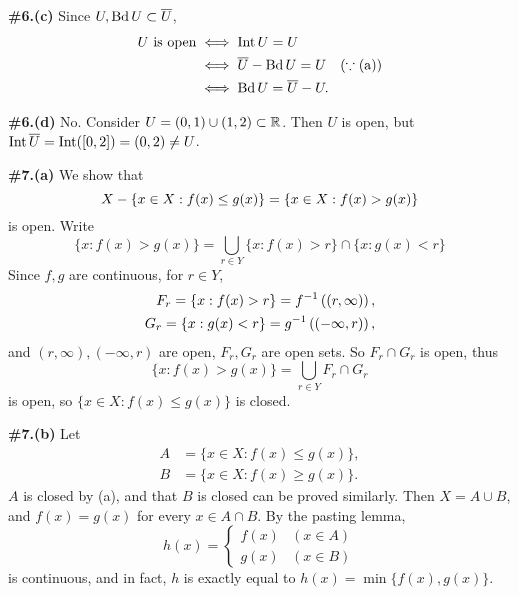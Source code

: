 \documentclass[a4paper,11pt]{article}
\begin{document}
\begin{minipage}[t][270mm]{90mm}
    {\bfseries \large \#6.(c)} Since \(U, \operatorname{Bd} U \subset \overline{U}\),
    \[
        \begin{aligned}
            U \text{ is open} & \iff \operatorname{Int} U = U                                       \\
                              & \iff \overline{U} - \operatorname{Bd} U  = U \quad (\because \text{(a)}) \\
                              & \iff \operatorname{Bd} U = \overline{U} - U.
        \end{aligned}
    \]
\end{minipage}
{\color{gray}\vline}
\begin{minipage}[t][270mm]{90mm}
    \phantom{?} {\bfseries \large \#6.(d)} No. Consider \(U = (0, 1) \cup (1, 2) \subset \mathbb{R}\). Then \(U\) is open, but \(\operatorname{Int} \overline{U} = \operatorname{Int}([0, 2]) = (0, 2) \neq U\).
\end{minipage}

\newpage

\phantom{?}
\vspace{5mm}

\begin{minipage}[t][270mm]{90mm}
    {\bfseries \large \#7.(a)} We show that
    \[
        X - \{x \in X : f(x) \leq g(x) \} = \{x \in X: f(x) > g(x)\}
    \]
    is open. Write
    \[
        \{x : f(x) > g(x)\} = \bigcup_{r \in Y} \{x : f(x) > r\} \cap \{x : g(x) < r\}
    \]
    Since \(f, g\) are continuous, for \(r \in Y\),
    \[
        \begin{aligned}
            F_r = \{x : f(x) > r\} = f^{-1}\left( (r, \infty) \right), \\
            G_r = \{x : g(x) < r\} = g^{-1}\left( (-\infty, r) \right),
        \end{aligned}
    \]
    and \((r, \infty), (-\infty, r)\) are open, \(F_r, G_r\) are open sets. So \(F_r \cap G_r\) is open, thus
    \[
        \{x : f(x) > g(x)\} = \bigcup_{r \in Y} F_r \cap G_r
    \]
    is open, so \(\{x \in X : f(x) \leq g(x)\}\) is closed.
\end{minipage}
{\color{gray}\vline}
\begin{minipage}[t][270mm]{90mm}
    \phantom{?} {\bfseries \large \#7.(b)} Let
    \[
        \begin{aligned}
            A & = \{x \in X : f(x) \leq g(x)\}, \\
            B & = \{x \in X : f(x) \geq g(x)\}.
        \end{aligned}
    \]
    \(A\) is closed by (a), and that \(B\) is closed can be proved similarly. Then \(X = A \cup B\), and \(f(x) = g(x)\) for every \(x \in A \cap B\). By the pasting lemma,
    \[
        h(x) = \begin{cases}
            f(x) & (x\in A) \\ g(x) & (x \in B)
        \end{cases}
    \]
    is continuous, and in fact, \(h\) is exactly equal to \(h(x) = \min\{f(x), g(x)\}\).
\end{minipage}
\end{document}
